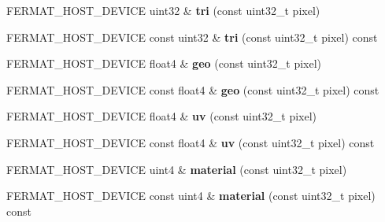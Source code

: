 \begin{DoxyCompactItemize}
\item 
\mbox{\label{struct_g_buffer_view_a4794b86513d295ef66b1f9b3afadf1b2}} 
F\+E\+R\+M\+A\+T\+\_\+\+H\+O\+S\+T\+\_\+\+D\+E\+V\+I\+CE uint32 \& {\bfseries tri} (const uint32\+\_\+t pixel)
\item 
\mbox{\label{struct_g_buffer_view_af5339e6867e691bfada1a8a4e825b8e1}} 
F\+E\+R\+M\+A\+T\+\_\+\+H\+O\+S\+T\+\_\+\+D\+E\+V\+I\+CE const uint32 \& {\bfseries tri} (const uint32\+\_\+t pixel) const
\item 
\mbox{\label{struct_g_buffer_view_aa64fc1df589eefb3a6c7e4a3a8bfd094}} 
F\+E\+R\+M\+A\+T\+\_\+\+H\+O\+S\+T\+\_\+\+D\+E\+V\+I\+CE float4 \& {\bfseries geo} (const uint32\+\_\+t pixel)
\item 
\mbox{\label{struct_g_buffer_view_aa6168ed8ffef6d4e2e8586c858b89c54}} 
F\+E\+R\+M\+A\+T\+\_\+\+H\+O\+S\+T\+\_\+\+D\+E\+V\+I\+CE const float4 \& {\bfseries geo} (const uint32\+\_\+t pixel) const
\item 
\mbox{\label{struct_g_buffer_view_a61e053ea67f67332cb690dfdd0ca3a04}} 
F\+E\+R\+M\+A\+T\+\_\+\+H\+O\+S\+T\+\_\+\+D\+E\+V\+I\+CE float4 \& {\bfseries uv} (const uint32\+\_\+t pixel)
\item 
\mbox{\label{struct_g_buffer_view_a393dbbd33f1c7fcbd36358eb001ca0d9}} 
F\+E\+R\+M\+A\+T\+\_\+\+H\+O\+S\+T\+\_\+\+D\+E\+V\+I\+CE const float4 \& {\bfseries uv} (const uint32\+\_\+t pixel) const
\item 
\mbox{\label{struct_g_buffer_view_a597fa8fd3231de4e6b2a83804fd58035}} 
F\+E\+R\+M\+A\+T\+\_\+\+H\+O\+S\+T\+\_\+\+D\+E\+V\+I\+CE uint4 \& {\bfseries material} (const uint32\+\_\+t pixel)
\item 
\mbox{\label{struct_g_buffer_view_a881d546dd38531f2e0de9f405875f14e}} 
F\+E\+R\+M\+A\+T\+\_\+\+H\+O\+S\+T\+\_\+\+D\+E\+V\+I\+CE const uint4 \& {\bfseries material} (const uint32\+\_\+t pixel) const
\item 
\mbox{\label{struct_g_buffer_view_ab3787dcdc150758bf2e7a2ce2c1f2ad4}} 

\end{DoxyCompactItemize}
